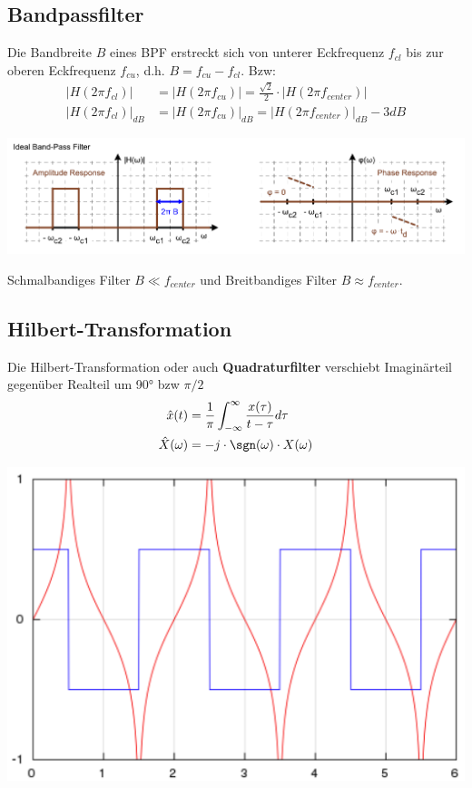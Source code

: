 \subsection{Bandpassfilter}
Die Bandbreite $B$ eines BPF erstreckt sich von unterer Eckfrequenz $f_{cl}$ bis zur oberen Eckfrequenz $f_{cu}$, d.h. $B = f_{cu} - f_{cl}$. Bzw:
\begin{align*}
	\left|H(2\pi f_{cl})\right| &= \left|H(2\pi f_{cu})\right| = \frac{\sqrt{2}}{2}\cdot \left|H(2\pi f_{center})\right| \\
	\left|H(2\pi f_{cl})\right|_{dB} &= \left|H(2\pi f_{cu})\right|_{dB} = \left|H(2\pi f_{center})\right|_{dB} - 3dB
\end{align*}
\begin{center}
	\includegraphics[width=0.8\columnwidth]{Images/bandpass}
\end{center}

\noindent Schmalbandiges Filter $B \ll f_{center}$ und Breitbandiges Filter $B \approx f_{center}$.

\subsection{Hilbert-Transformation}\label{hilbert}
Die Hilbert-Transformation oder auch \textbf{Quadraturfilter} verschiebt Imaginärteil gegenüber Realteil um 90° bzw $\pi/2$ 
\begin{align*}
	\hat{x}(t) &= \frac{1}{\pi}\int_{-\infty}^{\infty}\frac{x(\tau)}{t - \tau}d\tau \\
	\hat{X}(\omega) &= -j \cdot \sgn(\omega) \cdot X(\omega)
\end{align*}

\begin{center}
	\includegraphics[width=0.6\columnwidth]{Images/hilbert}
\end{center}